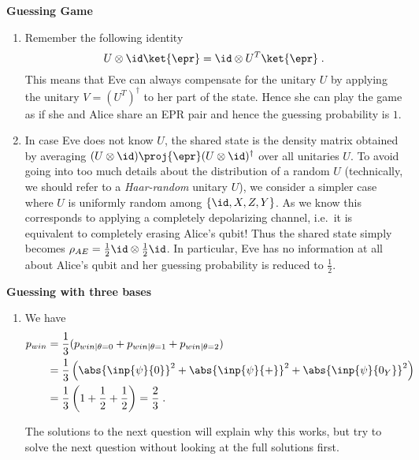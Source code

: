 \begin{exercises}
\item {\bf Guessing Game}
\begin{enumerate}
\item Remember the following identity \[U\otimes \id \ket{\epr} = \id\otimes U^{T} \ket{\epr}\;.\] This means that Eve can always compensate for the unitary \(U\) by applying the unitary \(V = (U^{T})^{\dagger}\) to her part of the state. Hence she can play the game as if she and Alice share an EPR pair and hence the guessing probability is $1$.
\item In case Eve does not know $U$, the shared state is the density matrix obtained by averaging $(U\otimes \id) \proj{\epr} (U\otimes \id)^\dagger$ over all unitaries $U$. To avoid going into too much details about the distribution of a random $U$ (technically, we should refer to a \emph{Haar-random} unitary $U$), we consider a simpler case where $U$ is uniformly random among $\{\id, X,Z,Y\}$. As we know this corresponds to applying a completely depolarizing channel, i.e.\ it is equivalent to completely erasing Alice's qubit! Thus the shared state simply becomes $\rho_{AE} = \frac{1}{2}\id\otimes \frac{1}{2}\id$. In particular, Eve has no information at all about Alice's qubit and her guessing probability is reduced to $\frac{1}{2}$. 
\end{enumerate}


\item {\bf Guessing with three bases}

\begin{enumerate}
\item We have
\begin{align*}	
	p_{win} &= \frac{1}{3}(p_{win|\theta = 0} + p_{win|\theta = 1}+ p_{win|\theta = 2}) \\
	&=\frac{1}{3}\left(\abs{\inp{\psi}{0}}^2+\abs{\inp{\psi}{+}}^2+\abs{\inp{\psi}{0_Y}}^2 \right) \\
	&=\frac{1}{3}\left(1+\frac{1}{2}+\frac{1}{2} \right)=\frac{2}{3}\;.
\end{align*}

The solutions to the next question will explain why this works, but try to solve the next question without looking at the full solutions first.


\end{enumerate}
\end{exercises}
